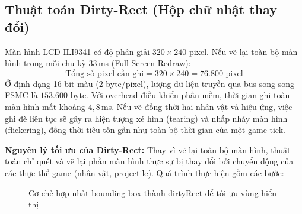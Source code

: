 \documentclass[a4paper,12pt]{report}
\begin{document}
\subsection{Thuật toán Dirty-Rect (Hộp chữ nhật thay đổi)}

Màn hình LCD ILI9341 có độ phân giải $320 \times 240$ pixel. Nếu vẽ lại toàn bộ màn hình trong mỗi chu kỳ 33\,ms (Full Screen Redraw):
\[
\text{Tổng số pixel cần ghi} = 320 \times 240 = 76.800 \text{ pixel}
\]
Ở định dạng 16-bit màu (2 byte/pixel), lượng dữ liệu truyền qua bus song song FSMC là $153.600$ byte. Với overhead điều khiển phần mềm, thời gian ghi toàn màn hình mất khoảng $4{,}8$\,ms. Nếu vẽ đồng thời hai nhân vật và hiệu ứng, việc ghi đè liên tục sẽ gây ra hiện tượng xé hình (tearing) và nhấp nháy màn hình (flickering), đồng thời tiêu tốn gần như toàn bộ thời gian của một game tick.

\noindent \textbf{Nguyên lý tối ưu của Dirty-Rect:}
Thay vì vẽ lại toàn bộ màn hình, thuật toán chỉ quét và vẽ lại phần màn hình thực sự bị thay đổi bởi chuyển động của các thực thể game (nhân vật, projectile). Quá trình thực hiện gồm các bước:

\begin{figure}[H]
\centering
{}
\caption{Cơ chế hợp nhất bounding box thành dirtyRect để tối ưu vùng hiển thị}
\label{fig:dirty-rect-detail}
\end{figure}
\end{document}

